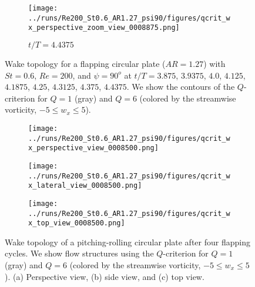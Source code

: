 \begin{figure}
\begin{subfigure}[b]{0.3\textwidth}
  \end{subfigure}
  \hfill
  \begin{subfigure}[b]{0.3\textwidth}
    \centering
    \texttt{[image: ../runs/Re200\_St0.6\_AR1.27\_psi90/figures/qcrit\_wx\_perspective\_zoom\_view\_0008875.png]}
    \caption{$t / T = 4.4375$}
  \end{subfigure}
  \caption{Wake topology for a flapping circular plate ($AR = 1.27$) with $St = 0.6$, $Re = 200$, and $\psi = 90^o$ at $t / T = 3.875$, $3.9375$, $4.0$, $4.125$, $4.1875$, $4.25$, $4.3125$, $4.375$, $4.4375$. We show the contours of the $Q$-criterion for $Q = 1$ (gray) and $Q = 6$ (colored by the streamwise vorticity, $-5 \leq w_x \leq 5$).}
  \label{fig:baseline_qcrit_perspective}
\end{figure}

\begin{figure}
  \centering
  \begin{minipage}{0.45\linewidth}
    \begin{subfigure}[t]{\linewidth}
      \texttt{[image: ../runs/Re200\_St0.6\_AR1.27\_psi90/figures/qcrit\_wx\_perspective\_view\_0008500.png]}
      \caption{}
    \end{subfigure}
  \end{minipage}
  \begin{minipage}{0.45\linewidth}
    \begin{subfigure}[t]{\linewidth}
      \texttt{[image: ../runs/Re200\_St0.6\_AR1.27\_psi90/figures/qcrit\_wx\_lateral\_view\_0008500.png]}
      \caption{}
    \end{subfigure}
    \vspace{1cm}
    \begin{subfigure}[b]{\linewidth}
      \texttt{[image: ../runs/Re200\_St0.6\_AR1.27\_psi90/figures/qcrit\_wx\_top\_view\_0008500.png]}
      \caption{}
    \end{subfigure}
  \end{minipage}
  \caption{Wake topology of a pitching-rolling circular plate after four flapping cycles. We show flow structures  using the $Q$-criterion for $Q = 1$ (gray) and $Q = 6$ (colored by the streamwise vorticity, $-5 \leq w_x \leq 5$). (a) Perspective view, (b) side view, and (c) top view.}
  \label{fig:baseline_wake_topology}
\end{figure}

